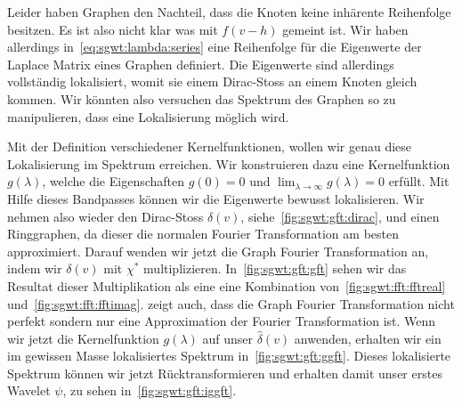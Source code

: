 Leider haben Graphen den Nachteil, dass die Knoten keine inh\"arente 
Reihenfolge besitzen. Es ist also nicht klar was mit $f(v - h)$ gemeint ist. 
Wir haben allerdings in~\cref{eq:sgwt:lambda:series} eine Reihenfolge f\"ur die 
Eigenwerte der Laplace Matrix eines Graphen definiert. Die Eigenwerte sind 
allerdings vollst\"andig lokalisiert, womit sie einem Dirac-Stoss an einem 
Knoten gleich kommen. Wir k\"onnten also versuchen das Spektrum des Graphen so 
zu manipulieren, dass eine Lokalisierung m\"oglich wird.

Mit der Definition verschiedener Kernelfunktionen, wollen wir genau diese 
Lokalisierung im Spektrum erreichen. Wir konstruieren dazu eine Kernelfunktion 
$g(\lambda)$, welche die Eigenschaften $g(0) = 0$ und $\lim_{\lambda\to\infty} 
g(\lambda) = 0$ erf\"ullt. Mit Hilfe dieses Bandpasses k\"onnen wir die 
Eigenwerte bewusst lokalisieren.
Wir nehmen also wieder den Dirac-Stoss $\delta(v)$, 
siehe~\cref{fig:sgwt:gft:dirac}, und einen Ringgraphen, da dieser die normalen 
Fourier Transformation am besten 
approximiert. Darauf wenden wir jetzt die Graph Fourier Transformation an, 
indem wir $\delta(v)$ mit $\chi^*$ multiplizieren.
In~\cref{fig:sgwt:gft:gft} sehen wir das Resultat dieser Multiplikation als eine
eine Kombination von~\cref{fig:sgwt:fft:fftreal} 
und~\cref{fig:sgwt:fft:fftimag}.  zeigt auch, 
dass die Graph Fourier Transformation nicht perfekt sondern nur eine 
Approximation der Fourier Transformation ist. Wenn wir jetzt die Kernelfunktion 
$g(\lambda)$ auf unser $\hat{\delta}(v)$ anwenden, erhalten wir ein im gewissen 
Masse lokalisiertes Spektrum in~\cref{fig:sgwt:gft:ggft}. Dieses lokalisierte 
Spektrum k\"onnen wir jetzt R\"ucktransformieren und erhalten damit unser 
erstes Wavelet $\psi$, zu sehen in~\cref{fig:sgwt:gft:iggft}.
